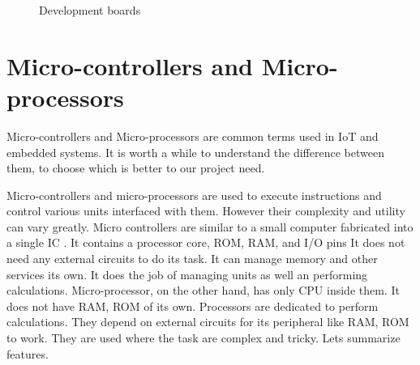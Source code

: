 \begin{figure}
    \centering
    \caption{Development boards}
\end{figure}

\section{Micro-controllers and Micro-processors}
\par Micro-controllers and Micro-processors are common terms used in \ac{IoT} and embedded systems. It is worth a while to understand the difference between them, to choose which is better to our project need.
\par Micro-controllers and micro-processors are used to execute instructions and control various units interfaced with them. However their complexity and utility can vary greatly. Micro controllers are similar to a small computer fabricated into a single \ac{IC} . It contains a processor core, ROM, RAM, and I/O pins It does not need any external circuits to do its task. It can manage memory and other services its own. It does the job of managing units as well an performing calculations. Micro-processor, on the other hand, has only CPU inside them. It does not have RAM, ROM of its own. Processors are dedicated to perform calculations. They depend on external circuits for its peripheral like RAM, ROM to work. They are used where the task are complex and tricky. Lets summarize features.

